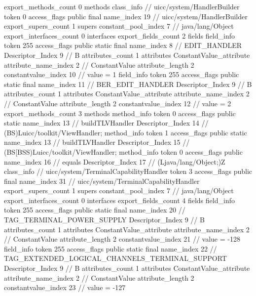 {{{{{{{				}
				}
			}
			}
			export_methods_count	0
			methods {
			}
		}
		class_info {		// uicc/system/HandlerBuilder
			token	0
			access_flags	public final
			name_index	19		// uicc/system/HandlerBuilder
			export_supers_count	1
			supers {
				constant_pool_index	7		// java/lang/Object
			}
			export_interfaces_count	0
			interfaces {
			}
			export_fields_count	2
			fields {
			field_info {
				token	255
				access_flags	public static final
				name_index	8		// EDIT_HANDLER
				Descriptor_Index	9		// B
				attributes_count	1
				attributes {
				ConstantValue_attribute {
					attribute_name_index	2		// ConstantValue
					attribute_length	2
					constantvalue_index	10		// value = 1
				}
				}
			}
			field_info {
				token	255
				access_flags	public static final
				name_index	11		// BER_EDIT_HANDLER
				Descriptor_Index	9		// B
				attributes_count	1
				attributes {
				ConstantValue_attribute {
					attribute_name_index	2		// ConstantValue
					attribute_length	2
					constantvalue_index	12		// value = 2
				}
				}
			}
			}
			export_methods_count	3
			methods {
				method_info {
					token	0
					access_flags	public static
					name_index	13		// buildTLVHandler
					Descriptor_Index	14		// (BS)Luicc/toolkit/ViewHandler;
				}
				method_info {
					token	1
					access_flags	public static
					name_index	13		// buildTLVHandler
					Descriptor_Index	15		// (BS[BSS)Luicc/toolkit/ViewHandler;
				}
				method_info {
					token	0
					access_flags	public
					name_index	16		// equals
					Descriptor_Index	17		// (Ljava/lang/Object;)Z
				}
			}
		}
		class_info {		// uicc/system/TerminalCapabilityHandler
			token	3
			access_flags	public final
			name_index	31		// uicc/system/TerminalCapabilityHandler
			export_supers_count	1
			supers {
				constant_pool_index	7		// java/lang/Object
			}
			export_interfaces_count	0
			interfaces {
			}
			export_fields_count	4
			fields {
			field_info {
				token	255
				access_flags	public static final
				name_index	20		// TAG_TERMINAL_POWER_SUPPLY
				Descriptor_Index	9		// B
				attributes_count	1
				attributes {
				ConstantValue_attribute {
					attribute_name_index	2		// ConstantValue
					attribute_length	2
					constantvalue_index	21		// value = -128
				}
				}
			}
			field_info {
				token	255
				access_flags	public static final
				name_index	22		// TAG_EXTENDED_LOGICAL_CHANNELS_TERMINAL_SUPPORT
				Descriptor_Index	9		// B
				attributes_count	1
				attributes {
				ConstantValue_attribute {
					attribute_name_index	2		// ConstantValue
					attribute_length	2
					constantvalue_index	23		// value = -127
}}}}}}}

